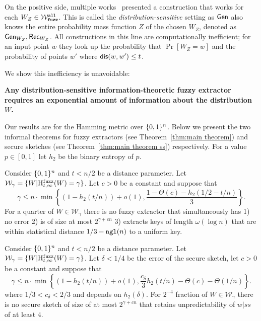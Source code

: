 On the positive side, multiple works~\cite{hayashi2014secret,hayashi2016secret,fuller2016fuzzy,woodage2017new,tyagi2017universal,TVW18,LA18,fuller2019continuous,fuller2020fuzzy} presented a construction that works for each $W_Z\in \mathcal{W}_{\mathtt{fuzz}}^{\mathtt{all}}$.  This is called the \emph{distribution-sensitive} setting as ${\mathsf{Gen}}$ also knows the entire probability mass function $Z$ of the chosen $W_Z$, denoted as ${\mathsf{Gen}}_{W_Z}, {\mathsf{Rec}}_{W_Z}$.  All constructions in this line are computationally inefficient; for an input point $w$ they look up the probability that $\Pr[W_Z=w]$ and the probability of points $w'$ where $\mathsf{dis}(w, w')\le t$.  

We show this inefficiency is unavoidable:
\begin{displayquote}
\textbf{Any distribution-sensitive information-theoretic fuzzy extractor requires an exponential amount of information about the distribution $W$.} 
\end{displayquote} 
Our results are for the Hamming metric over $\{0, 1\}^n$. Below we present the two informal theorems for fuzzy extractors (see Theorem~\ref{thm:main theorem}) and secure sketches (see Theorem~\ref{thm:main theorem ss}) respectively.  For a value $p\in [0,1]$ let $h_2$ be the binary entropy of $p$. 

\begin{theorem}
Consider $\{0, 1\}^n$ and $t< n/2$ be a distance parameter.  Let $\mathcal{W}_\gamma=\{W | \mathrm{H}^{\mathtt{fuzz}}_{t,\infty}(W) = \gamma\}$.  Let $c>0$ be a constant and suppose that \[
\gamma \le n\cdot\min\left\{(1-h_2(t/n)) +o(1), \frac{1-\Theta(c)-h_2(1/2-t/n)}{3}\right\}.
\]
 For a quarter of $W \in \mathcal{W}_\gamma$ there is no fuzzy extractor that simultaneously has 1) no error 2) is of size at most $2^{\gamma+cn}$ 3) extracts keys of length $\omega(\log n)$ that are within statistical distance $1/3-\mathtt{ngl}(n)$ to a uniform key.
\end{theorem}

\begin{theorem}
Consider $\{0, 1\}^n$ and $t< n/2$ be a distance parameter.  Let $\mathcal{W}_\gamma=\{W | \mathrm{H}^{\mathtt{fuzz}}_{t,\infty}(W) = \gamma\}$.  Let $\delta<1/4$ be the error of the secure sketch, let $c>0$ be a constant and suppose that \[
\gamma \le n\cdot\min\left\{(1-h_2(t/n)) +o(1), \frac{c_\delta}{3}h_2(t/n)-\Theta(c)-\Theta(1/n)\right\}.
\]
where $1/3< c_\delta <2/3$ and depends on $h_2(\delta)$. 
 For $2^{-4}$ fraction of $W \in \mathcal{W}_\gamma$ there is no secure sketch of
size of at most $2^{\gamma+cn}$ that
 retains unpredictability of $w|ss$ of at  least $4$.
\end{theorem}

